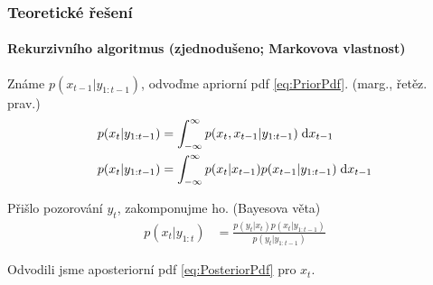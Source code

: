 \documentclass[12pt]{beamer}
\begin{document}
% 
% 

\begin{frame}
	\frametitle{Teoretické řešení}
	\framesubtitle{Rekurzivního algoritmus (zjednodušeno; Markovova vlastnost)}

	{\small Známe \(p(x_{t-1} | y_{1:t-1})\), odvoďme apriorní pdf \eqref{eq:PriorPdf}.}
	{\scriptsize (marg., řetěz. prav.)}
	\begin{align}
		p(x_t | y_{1:t-1}) &= \int_{-\infty}^{\infty} p(x_t, x_{t-1} | y_{1:t-1})
		\; \mathrm{d} x_{t-1} \notag \\
		p(x_t | y_{1:t-1}) &= \int_{-\infty}^{\infty} p(x_t | x_{t-1}) p(x_{t-1} | y_{1:t-1})
		\; \mathrm{d} x_{t-1} \label{eq:PriorPdf}
	\end{align}

	{\small Přišlo pozorování \(y_t\), zakomponujme ho.}
	{\scriptsize (Bayesova věta)}
	\begin{align}
		p(x_t | y_{1:t}) &= \frac{p(y_t | x_t) p(x_t | y_{1:t-1})}{p(y_t | y_{1:t-1})}
		\label{eq:PosteriorPdf}
	\end{align}

	{\small Odvodili jsme aposteriorní pdf \eqref{eq:PosteriorPdf} pro \(x_t\).}
\end{frame}
\end{document}
